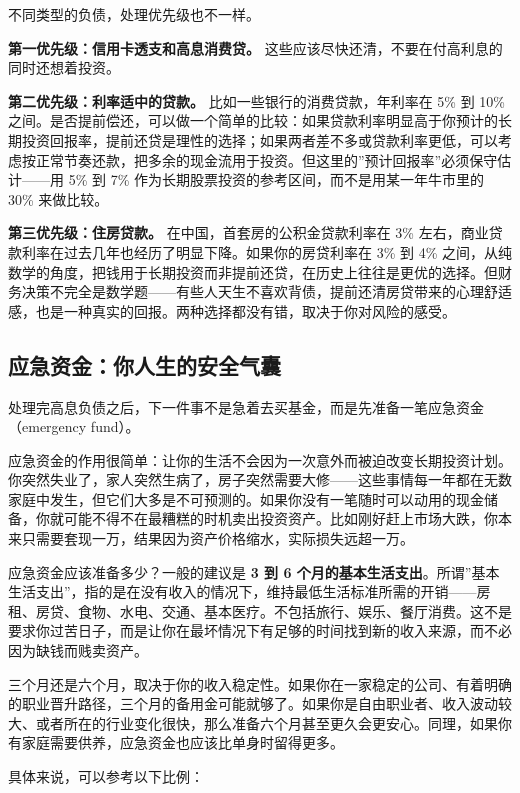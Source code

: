 \documentclass[a4paper,11pt,oneside,fontset=none,UTF8,zihao=-4]{ctexbook}
\begin{document}
不同类型的负债，处理优先级也不一样。

\textbf{第一优先级：信用卡透支和高息消费贷。}
这些应该尽快还清，不要在付高利息的同时还想着投资。

\textbf{第二优先级：利率适中的贷款。} 比如一些银行的消费贷款，年利率在
5\% 到 10\%
之间。是否提前偿还，可以做一个简单的比较：如果贷款利率明显高于你预计的长期投资回报率，提前还贷是理性的选择；如果两者差不多或贷款利率更低，可以考虑按正常节奏还款，把多余的现金流用于投资。但这里的''预计回报率''必须保守估计------用
5\% 到 7\% 作为长期股票投资的参考区间，而不是用某一年牛市里的 30\%
来做比较。

\textbf{第三优先级：住房贷款。} 在中国，首套房的公积金贷款利率在 3\%
左右，商业贷款利率在过去几年也经历了明显下降。如果你的房贷利率在 3\% 到
4\%
之间，从纯数学的角度，把钱用于长期投资而非提前还贷，在历史上往往是更优的选择。但财务决策不完全是数学题------有些人天生不喜欢背债，提前还清房贷带来的心理舒适感，也是一种真实的回报。两种选择都没有错，取决于你对风险的感受。

\subsection{应急资金：你人生的安全气囊}\label{ux5e94ux6025ux8d44ux91d1ux4f60ux4ebaux751fux7684ux5b89ux5168ux6c14ux56ca}

处理完高息负债之后，下一件事不是急着去买基金，而是先准备一笔应急资金（emergency
fund）。

应急资金的作用很简单：让你的生活不会因为一次意外而被迫改变长期投资计划。你突然失业了，家人突然生病了，房子突然需要大修------这些事情每一年都在无数家庭中发生，但它们大多是不可预测的。如果你没有一笔随时可以动用的现金储备，你就可能不得不在最糟糕的时机卖出投资资产。比如刚好赶上市场大跌，你本来只需要套现一万，结果因为资产价格缩水，实际损失远超一万。

应急资金应该准备多少？一般的建议是 \textbf{3 到 6
个月的基本生活支出}。所谓''基本生活支出''，指的是在没有收入的情况下，维持最低生活标准所需的开销------房租、房贷、食物、水电、交通、基本医疗。不包括旅行、娱乐、餐厅消费。这不是要求你过苦日子，而是让你在最坏情况下有足够的时间找到新的收入来源，而不必因为缺钱而贱卖资产。

三个月还是六个月，取决于你的收入稳定性。如果你在一家稳定的公司、有着明确的职业晋升路径，三个月的备用金可能就够了。如果你是自由职业者、收入波动较大、或者所在的行业变化很快，那么准备六个月甚至更久会更安心。同理，如果你有家庭需要供养，应急资金也应该比单身时留得更多。

具体来说，可以参考以下比例：
\end{document}
